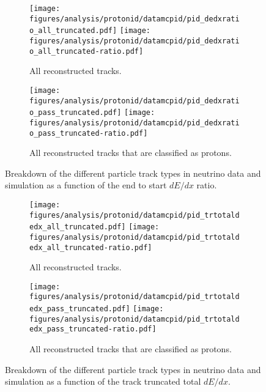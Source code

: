     \begin{figure}[h]
      \centering
      \begin{subfigure}[t]{2.5in}
        \texttt{[image: figures/analysis/protonid/datamcpid/pid\_dedxratio\_all\_truncated.pdf]}
        \texttt{[image: figures/analysis/protonid/datamcpid/pid\_dedxratio\_all\_truncated-ratio.pdf]}
        \caption{All reconstructed tracks.}
      \end{subfigure}
      \hspace{2pt}
      \begin{subfigure}[t]{2.5in}
        \texttt{[image: figures/analysis/protonid/datamcpid/pid\_dedxratio\_pass\_truncated.pdf]}
        \texttt{[image: figures/analysis/protonid/datamcpid/pid\_dedxratio\_pass\_truncated-ratio.pdf]}
        \caption{All reconstructed tracks that are classified as protons.}
      \end{subfigure}
      \caption{Breakdown of the different particle track types in neutrino data
      and simulation as a function of the end to start $dE/dx$ ratio.}
      \label{fig:piddedxratio}
    \end{figure}
    \begin{figure}[h]
      \centering
      \begin{subfigure}[t]{2.5in}
        \texttt{[image: figures/analysis/protonid/datamcpid/pid\_trtotaldedx\_all\_truncated.pdf]}
        \texttt{[image: figures/analysis/protonid/datamcpid/pid\_trtotaldedx\_all\_truncated-ratio.pdf]}
        \caption{All reconstructed tracks.}
      \end{subfigure}
      \hspace{2pt}
      \begin{subfigure}[t]{2.5in}
        \texttt{[image: figures/analysis/protonid/datamcpid/pid\_trtotaldedx\_pass\_truncated.pdf]}
        \texttt{[image: figures/analysis/protonid/datamcpid/pid\_trtotaldedx\_pass\_truncated-ratio.pdf]}
        \caption{All reconstructed tracks that are classified as protons.}
      \end{subfigure}
      \caption{Breakdown of the different particle track types in neutrino data
      and simulation as a function of the track truncated total $dE/dx$.}
      \label{fig:pidtrtotaldedx}
    \end{figure}
